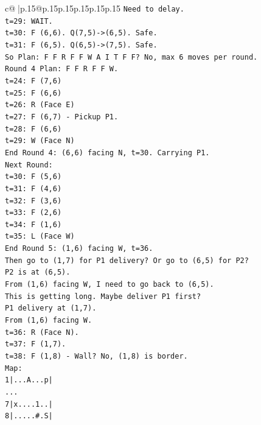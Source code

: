 \documentclass{article}
\begin{document}
{\begin{supertabular}{c@{$\;$}|p{.15\linewidth}@{}p{.15\linewidth}p{.15\linewidth}p{.15\linewidth}p{.15\linewidth}p{.15\linewidth}}
{{{\texttt{Need to delay.} \\
\texttt{t=29: WAIT.} \\
\texttt{t=30: F (6,6). Q(7,5){-}>(6,5). Safe.} \\
\texttt{t=31: F (6,5). Q(6,5){-}>(7,5). Safe.} \\
\texttt{So Plan: F F R F F W A I T F F? No, max 6 moves per round.} \\
\texttt{Round 4 Plan: F F R F F W.} \\
\texttt{t=24: F (7,6)} \\
\texttt{t=25: F (6,6)} \\
\texttt{t=26: R (Face E)} \\
\texttt{t=27: F (6,7) {-} Pickup P1.} \\
\texttt{t=28: F (6,6)} \\
\texttt{t=29: W (Face N)} \\
\texttt{End Round 4: (6,6) facing N, t=30. Carrying P1.} \\
\texttt{Next Round:} \\
\texttt{t=30: F (5,6)} \\
\texttt{t=31: F (4,6)} \\
\texttt{t=32: F (3,6)} \\
\texttt{t=33: F (2,6)} \\
\texttt{t=34: F (1,6)} \\
\texttt{t=35: L (Face W)} \\
\texttt{End Round 5: (1,6) facing W, t=36.} \\
\texttt{Then go to (1,7) for P1 delivery? Or go to (6,5) for P2?} \\
\texttt{P2 is at (6,5).} \\
\texttt{From (1,6) facing W, I need to go back to (6,5).} \\
\texttt{This is getting long. Maybe deliver P1 first?} \\
\texttt{P1 delivery at (1,7).} \\
\texttt{From (1,6) facing W.} \\
\texttt{t=36: R (Face N).} \\
\texttt{t=37: F (1,7).} \\
\texttt{t=38: F (1,8) {-} Wall? No, (1,8) is border.} \\
\texttt{Map:} \\
\texttt{1|...A...p|} \\
\texttt{...} \\
\texttt{7|x....1..|} \\
\texttt{8|.....\#.S|} \\
}}}
\end{supertabular}}
\end{document}
